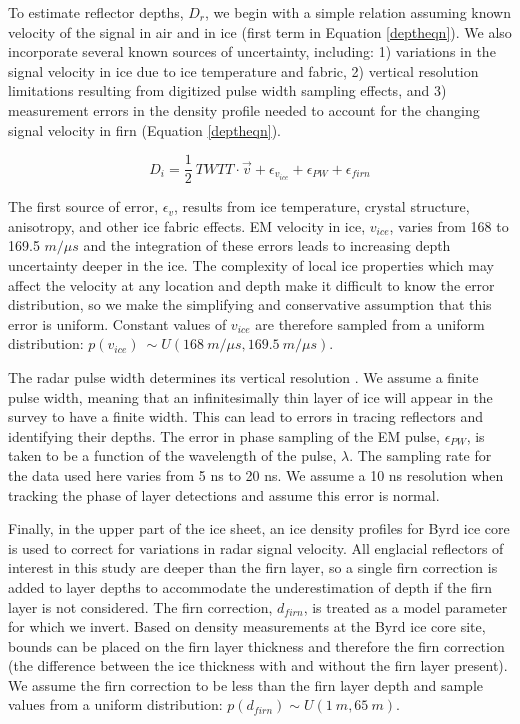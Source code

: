 To estimate reflector depths, $D_r$, we begin with a simple relation assuming known velocity of the signal in air and in ice (first term in Equation \ref{deptheqn}). We also incorporate several known sources of uncertainty, including: 1) variations in the signal velocity in ice due to ice temperature and fabric, 2) vertical resolution limitations resulting from digitized pulse width sampling effects, and 3) measurement errors in the density profile needed to account for the changing signal velocity in firn (Equation \ref{deptheqn}).

\begin{equation}\label{deptheqn}
D_i = \frac{1}{2}~TWTT \cdot \vec{v} + \epsilon_{v_{ice}} + \epsilon_{PW} + \epsilon_{firn}
\end{equation}

The first source of error, $\epsilon_{v}$, results from ice temperature, crystal structure, anisotropy, and other ice fabric effects. EM velocity in ice, $v_{ice}$, varies from 168 to 169.5 $m/{\mu}s$ \citep{fujita2000} and the integration of these errors leads to increasing depth uncertainty deeper in the ice.  The complexity of local ice properties which may affect the velocity at any location and depth make it difficult to know the error distribution, so we make the simplifying and conservative assumption that this error is uniform. Constant values of $v_{ice}$ are therefore sampled from a uniform distribution: $p(v_{ice}) ~\sim U(168~m/{\mu}s,169.5~m/{\mu}s)$.

The radar pulse width determines its vertical resolution \citep{millar1982}. We assume a finite pulse width, meaning that an infinitesimally thin layer of ice will appear in the survey to have a finite width. This can lead to errors in tracing reflectors and identifying their depths. The error in phase sampling of the EM pulse, $\epsilon_{PW}$, is taken to be a function of the wavelength of the pulse, $\lambda$. The sampling rate for the data used here varies from 5 ns to 20 ns. We assume a 10 ns resolution when tracking the phase of layer detections and assume this error is normal.

Finally, in the upper part of the ice sheet, an ice density profiles for %
Byrd \citep{gow1968} ice core is used to correct for variations in radar signal velocity. All englacial reflectors of interest in this study are deeper than the firn layer, so a single firn correction is added to layer depths to accommodate the underestimation of depth if the firn layer is not considered. The firn correction, $d_{firn}$, is treated as a model parameter for which we invert. Based on density measurements at the Byrd ice core site, bounds can be placed on the firn layer thickness and therefore the firn correction (the difference between the ice thickness with and without the firn layer present). We assume the firn correction to be less than the firn layer depth and sample values from a uniform distribution: $p(d_{firn}) \sim U(1~m, 65~m)$. %


